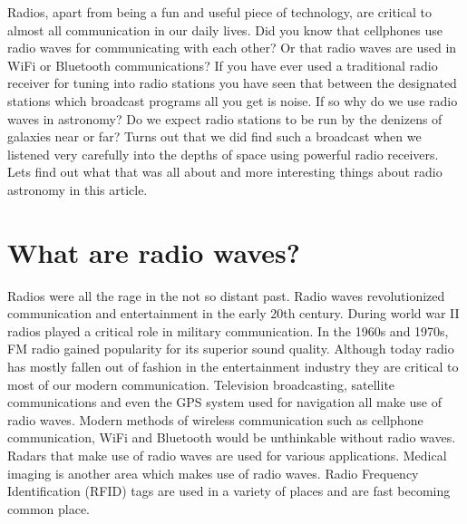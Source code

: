 \documentclass{../template/texnote}
\title{\textbf{\capitalisewords{The Little Green Men in Space}}}
\begin{document}
    \maketitle {}
Radios, apart from being a fun and useful piece of technology, are critical to almost all communication in our daily lives. Did you know that cellphones use radio waves for communicating with each other? Or that radio waves are used in WiFi or Bluetooth communications?
If you have ever used a traditional radio receiver for tuning into radio stations you have seen that between the designated stations which broadcast programs all you get is noise. If so 
 why do we use radio waves in astronomy? Do we expect radio stations to be run by the denizens of galaxies near or far? Turns out that we did find such a broadcast when we listened very carefully into the depths of space using powerful radio receivers. Lets find out what that was all about and more interesting things about radio astronomy in this article.
\section{What are radio waves?}
Radios were all the rage in the not so distant past. Radio waves revolutionized communication and entertainment in the early 20th century. During world war II radios played a critical role in military communication.  In the 1960s and 1970s, FM radio gained popularity for its superior sound quality. Although today radio has mostly fallen out of fashion in the entertainment industry they are critical to most of our modern communication. Television broadcasting, satellite communications and even the GPS system used for navigation all make use of radio waves. Modern methods of wireless communication such as cellphone communication, WiFi and Bluetooth would be unthinkable without radio waves. Radars that make use of radio waves are used for various applications. Medical imaging is another area which makes use of radio waves. Radio Frequency Identification (RFID) tags are used in  a variety of places and are fast becoming common place.
\end{document}
